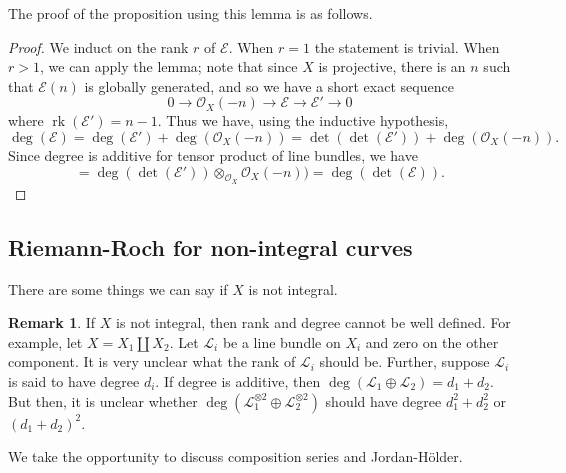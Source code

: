 \documentclass[10pt]{article}
\theoremstyle{definition}
\newtheorem{rmk}[thm]{Remark}
\DeclareMathOperator{\Ext}{Ext}
\DeclareMathOperator{\rk}{rk}
\newcommand{\PP}{\mathbb{P}}
\newcommand{\OO}{\mathcal{O}}
\begin{document}

The proof of the proposition using this lemma is as follows.
\begin{proof}
We induct on the rank $r$ of $\mathcal{E}$.  When $r=1$ the statement is trivial.  When $r > 1$, we can apply the lemma; note that since $X$ is projective, there is an $n$ such that $\mathcal{E}(n)$ is globally generated, and so we have a short exact sequence
$$0 \rightarrow \OO_X(-n) \rightarrow \mathcal{E} \rightarrow \mathcal{E}' \rightarrow 0$$
where $\rk(\mathcal{E}') = n-1$.  Thus we have, using the inductive hypothesis,
$$\deg(\mathcal{E}) = \deg(\mathcal{E}') + \deg(\OO_X(-n)) = \det(\det(\mathcal{E'})) + \deg(\OO_X(-n)).$$
Since degree is additive for tensor product of line bundles, we have
$$= \deg(\det(\mathcal{E}')) \otimes_{\OO_X} \OO_X(-n)) = \deg(\det(\mathcal{E})).$$
\end{proof}




\subsection{Riemann-Roch for non-integral curves}


There are some things we can say if $X$ is not integral.
\begin{rmk}
If $X$ is not integral, then rank and degree cannot be well defined.  For example, let $X = X_1 \coprod X_2$.  Let $\mathcal{L}_i$ be a line bundle on $X_i$ and zero on the other component.  It is very unclear what the rank of $\mathcal{L}_i$ should be.  Further, suppose $\mathcal{L}_i$ is said to have degree $d_i$.  If degree is additive, then $\deg(\mathcal{L}_1 \oplus \mathcal{L}_2) = d_1+d_2$.  But then, it is unclear whether $\deg(\mathcal{L}_1^{\otimes 2} \oplus \mathcal{L}_2^{\otimes 2})$ should have degree $d_1^2 + d_2^2$ or $(d_1+d_2)^2$.
\end{rmk}

We take the opportunity to discuss composition series and Jordan-H\"{o}lder.
\end{document}
